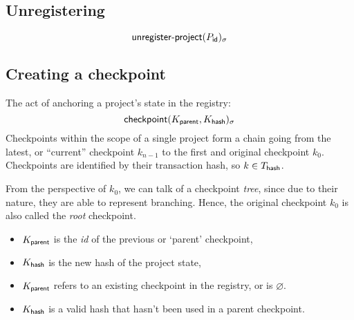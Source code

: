 \subsection{Unregistering}
\[
    \operatorname{\mathsf{unregister-project}}\lparen P_{\mathsf{id}}\rparen_\sigma
\]



\subsection{Creating a checkpoint}
\label{s:checkpoint}
The act of anchoring a project's state in the registry:
\[
    \operatorname{\mathsf{checkpoint}}\lparen K_{\mathsf{parent}}, K_{\mathsf{hash}}\rparen_\sigma
\]
Checkpoints within the scope of a single project form a chain going from the
latest, or ``current'' checkpoint $k_{n-1}$ to the first and original
checkpoint $k_0$. Checkpoints are identified by their transaction hash,
so $k \in T_{\mathsf{hash}}$.

From the perspective of $k_0$, we can talk of a checkpoint \emph{tree}, since
due to their nature, they are able to represent branching. Hence, the original
checkpoint $k_0$ is also called the \emph{root} checkpoint.

\begin{itemize}
    \item $K_{\mathsf{parent}}$ is the \emph{id} of the previous or `parent' checkpoint,
    \item $K_{\mathsf{hash}}$ is the new hash of the project state,
\end{itemize}
\validation
\begin{itemize}
    \item{$K_{\mathsf{parent}}$ refers to an existing checkpoint in the registry,
        or is $\varnothing$.}
    \item{$K_{\mathsf{hash}}$ is a valid hash that hasn't been used in a parent
        checkpoint.}
\end{itemize}

